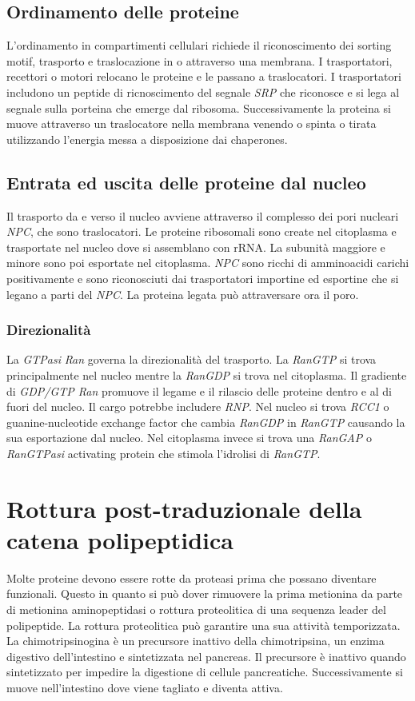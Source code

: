 \subsection{Ordinamento delle proteine}
L'ordinamento in compartimenti cellulari richiede il riconoscimento dei sorting motif, trasporto e traslocazione in o attraverso una membrana. I trasportatori, recettori o motori relocano le proteine e le passano a traslocatori. 
I trasportatori includono un peptide di ricnoscimento del segnale \emph{SRP} che riconosce e si lega al segnale sulla porteina che emerge dal ribosoma. Successivamente la proteina si muove attraverso un traslocatore nella
membrana venendo o spinta o tirata utilizzando l'energia messa a disposizione dai chaperones. 
\subsection{Entrata ed uscita delle proteine dal nucleo}
Il trasporto da e verso il nucleo avviene attraverso il complesso dei pori nucleari \emph{NPC}, che sono traslocatori. Le proteine ribosomali sono create nel citoplasma e trasportate nel nucleo dove si assemblano con rRNA. 
La subunit\`a maggiore e minore sono poi esportate nel citoplasma. \emph{NPC} sono ricchi di amminoacidi carichi positivamente e sono riconosciuti dai trasportatori importine ed esportine che si legano a parti del \emph{NPC}. 
La proteina legata pu\`o attraversare ora il poro. 
\subsubsection{Direzionalit\`a}
La \emph{GTPasi} \emph{Ran} governa la direzionalit\`a del trasporto. La \emph{RanGTP} si trova principalmente nel nucleo mentre la \emph{RanGDP} si trova nel citoplasma. Il gradiente di \emph{GDP/GTP Ran} promuove il legame e 
il rilascio delle proteine dentro e al di fuori del nucleo. Il cargo potrebbe includere \emph{RNP}. Nel nucleo si trova \emph{RCC1} o guanine-nucleotide exchange factor che cambia \emph{RanGDP} in \emph{RanGTP} causando la sua 
esportazione dal nucleo. Nel citoplasma invece si trova una \emph{RanGAP} o \emph{RanGTPasi} activating protein che stimola l'idrolisi di \emph{RanGTP}. 
\section{Rottura post-traduzionale della catena polipeptidica}
Molte proteine devono essere rotte da proteasi prima che possano diventare funzionali. Questo in quanto si pu\`o dover rimuovere la prima metionina da parte di metionina aminopeptidasi o rottura proteolitica di una sequenza 
leader del polipeptide. La rottura proteolitica pu\`o garantire una sua attivit\`a temporizzata. La chimotripsinogina \`e un precursore inattivo della chimotripsina, un enzima digestivo dell'intestino e sintetizzata nel 
pancreas. Il precursore \`e inattivo quando sintetizzato per impedire la digestione di cellule pancreatiche. Successivamente si muove nell'intestino dove viene tagliato e diventa attiva. 
